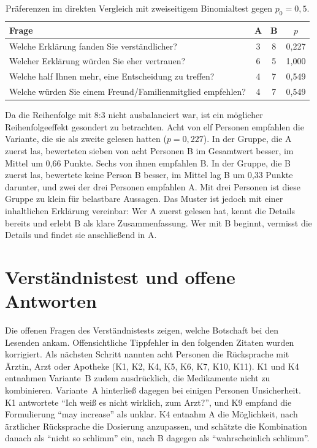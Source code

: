 \begin{table}[htbp]
  \centering
  \small
  \caption{Präferenzen im direkten Vergleich mit zweiseitigem Binomialtest gegen \(p_0 = 0{,}5\).}
  \label{tab:vergleich}
  \begin{tabular}{@{}lccc@{}}
    \toprule
    Frage & A & B & \(p\) \\
    \midrule
    Welche Erklärung fanden Sie verständlicher?                  & 3 & 8 & 0{,}227 \\
    Welcher Erklärung würden Sie eher vertrauen?                 & 6 & 5 & 1{,}000 \\
    Welche half Ihnen mehr, eine Entscheidung zu treffen?        & 4 & 7 & 0{,}549 \\
    Welche würden Sie einem Freund/Familienmitglied empfehlen?   & 4 & 7 & 0{,}549 \\
    \bottomrule
  \end{tabular}
\end{table}

Da die Reihenfolge mit 8:3 nicht ausbalanciert war, ist ein möglicher Reihenfolgeeffekt gesondert zu betrachten. Acht von elf Personen empfahlen die Variante, die sie als zweite gelesen hatten (\(p = 0{,}227\)). In der Gruppe, die A zuerst las, bewerteten sieben von acht Personen B im Gesamtwert besser, im Mittel um 0{,}66 Punkte. Sechs von ihnen empfahlen B. In der Gruppe, die B zuerst las, bewertete keine Person B besser, im Mittel lag B um 0{,}33 Punkte darunter, und zwei der drei Personen empfahlen A. Mit drei Personen ist diese Gruppe zu klein für belastbare Aussagen. Das Muster ist jedoch mit einer inhaltlichen Erklärung vereinbar: Wer A zuerst gelesen hat, kennt die Details bereits und erlebt B als klare Zusammenfassung. Wer mit B beginnt, vermisst die Details und findet sie anschließend in A.

\section{Verständnistest und offene Antworten}

Die offenen Fragen des Verständnistests zeigen, welche Botschaft bei den Lesenden ankam. Offensichtliche Tippfehler in den folgenden Zitaten wurden korrigiert. Als nächsten Schritt nannten acht Personen die Rücksprache mit Ärztin, Arzt oder Apotheke (K1, K2, K4, K5, K6, K7, K10, K11). K1 und K4 entnahmen Variante~B zudem ausdrücklich, die Medikamente nicht zu kombinieren. Variante~A hinterließ dagegen bei einigen Personen Unsicherheit. K1 antwortete \enquote{Ich weiß es nicht wirklich, zum Arzt?}, und K9 empfand die Formulierung \enquote{may increase} als unklar. K4 entnahm A die Möglichkeit, nach ärztlicher Rücksprache die Dosierung anzupassen, und schätzte die Kombination danach als \enquote{nicht so schlimm} ein, nach B dagegen als \enquote{wahrscheinlich schlimm}.

